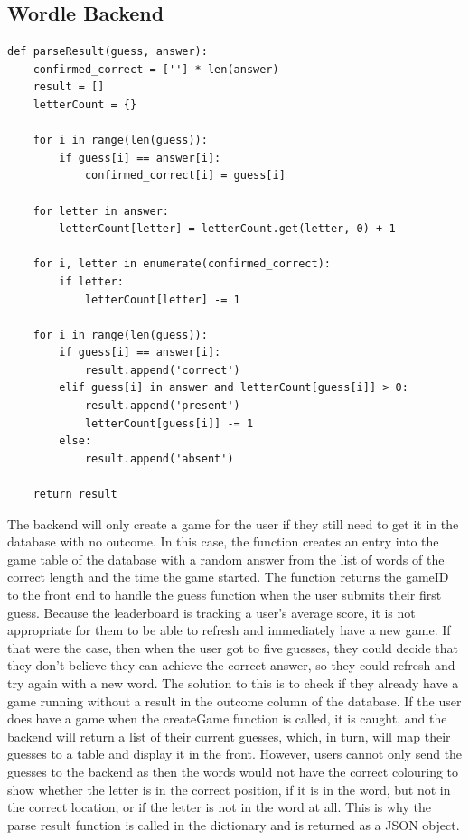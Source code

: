 \subsection{Wordle Backend}
\begin{lstlisting}[style=python, caption={The parseResult function}]
def parseResult(guess, answer):
    confirmed_correct = [''] * len(answer)
    result = []
    letterCount = {}

    for i in range(len(guess)):
        if guess[i] == answer[i]:
            confirmed_correct[i] = guess[i]

    for letter in answer:
        letterCount[letter] = letterCount.get(letter, 0) + 1

    for i, letter in enumerate(confirmed_correct):
        if letter:
            letterCount[letter] -= 1

    for i in range(len(guess)):
        if guess[i] == answer[i]:
            result.append('correct')
        elif guess[i] in answer and letterCount[guess[i]] > 0:
            result.append('present')
            letterCount[guess[i]] -= 1 
        else:
            result.append('absent')

    return result
\end{lstlisting}
The backend will only create a game for the user if they still need to get it in the database with no outcome. In this case, the function creates an entry into the game table of the database with a random answer from the list of words of the correct length and the time the game started. The function returns the gameID to the front end to handle the guess function when the user submits their first guess. Because the leaderboard is tracking a user's average score, it is not appropriate for them to be able to refresh and immediately have a new game. If that were the case, then when the user got to five guesses, they could decide that they don’t believe they can achieve the correct answer, so they could refresh and try again with a new word. The solution to this is to check if they already have a game running without a result in the outcome column of the database. If the user does have a game when the createGame function is called, it is caught, and the backend will return a list of their current guesses, which, in turn, will map their guesses to a table and display it in the front. However, users cannot only send the guesses to the backend as then the words would not have the correct colouring to show whether the letter is in the correct position, if it is in the word, but not in the correct location, or if the letter is not in the word at all. This is why the parse result function is called in the dictionary and is returned as a JSON object.

